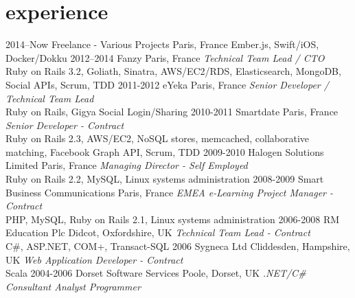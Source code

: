 \documentclass[]{friggeri-cv} %
\begin{document}

\section{experience}

\begin{entrylist}
\entry
{2014--Now}
{Freelance - Various Projects}
{Paris, France}
{Ember.js, Swift/iOS, Docker/Dokku}
\entry
{2012--2014}
{Fanzy}
{Paris, France}
{\emph{Technical Team Lead / CTO} \\
{\color{green}Ruby on Rails 3.2, Goliath, Sinatra, AWS/EC2/RDS, Elasticsearch, MongoDB, Social APIs, Scrum, TDD}}
\entry
{2011-2012}
{eYeka}
{Paris, France}
{\emph{Senior Developer / Technical Team Lead} \\
Ruby on Rails, Gigya Social Login/Sharing}
\entry
{2010-2011}
{Smartdate}
{Paris, France}
{\emph{Senior Developer - Contract} \\
Ruby on Rails 2.3, AWS/EC2, NoSQL stores, memcached, collaborative matching, Facebook Graph API, Scrum, TDD}
\entry
{2009-2010}
{Halogen Solutions Limited}
{Paris, France}
{\emph{Managing Director - Self Employed} \\
Ruby on Rails 2.2, MySQL, Linux systems administration}
\entry
{2008-2009}
{Smart Business Communications}
{Paris, France}
{\emph{EMEA e-Learning Project Manager - Contract} \\
PHP, MySQL, Ruby on Rails 2.1, Linux systems administration}
\entry
{2006-2008}
{RM Education Plc}
{Didcot, Oxfordshire, UK}
{\emph{Technical Team Lead - Contract} \\
C\#, ASP.NET, COM+, Transact-SQL}
\entry
{2006}
{Sygneca Ltd}
{Cliddesden, Hampshire, UK}
{\emph{Web Application Developer - Contract} \\
Scala}
\entry
{2004-2006}
{Dorset Software Services}
{Poole, Dorset, UK}
{\emph{.NET/C\# Consultant Analyst Programmer}}
\end{entrylist}
\end{document}
